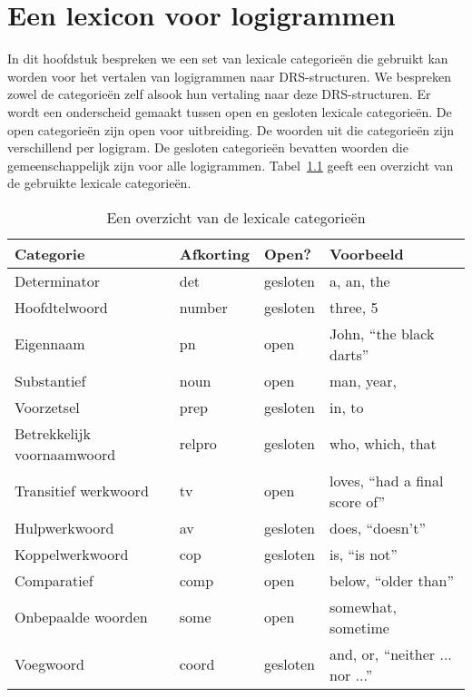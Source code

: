 \chapter{Een lexicon voor logigrammen}
\label{ch:lexicon}
In dit hoofdstuk bespreken we een set van lexicale categorieën die gebruikt kan worden voor het vertalen van logigrammen naar DRS-structuren. We bespreken zowel de categorieën zelf alsook hun vertaling naar deze DRS-structuren. Er wordt een onderscheid gemaakt tussen open en gesloten lexicale categorieën. De open categorieën zijn open voor uitbreiding. De woorden uit die categorieën zijn verschillend per logigram. De gesloten categorieën bevatten woorden die gemeenschappelijk zijn voor alle logigrammen. Tabel~\ref{tbl:lexiconCategories} geeft een overzicht van de gebruikte lexicale categorieën.

\begin{table}[t]
  \centering
  \begin{tabular}{llll}
    \toprule
    \textbf{Categorie} & \textbf{Afkorting} & \textbf{Open?} & \textbf{Voorbeeld}  \\ \midrule
    Determinator       & det                & gesloten & a, an, the \\
    Hoofdtelwoord      & number             & gesloten & three, 5      \\
    Eigennaam          & pn                 & open     & John, ``the black darts'' \\
    Substantief        & noun               & open     & man, year, \\
    Voorzetsel         & prep               & gesloten & in, to \\
    Betrekkelijk voornaamwoord & relpro     & gesloten & who, which, that \\
    Transitief werkwoord & tv               & open     & loves, ``had a final score of'' \\
    Hulpwerkwoord      & av                 & gesloten & does, ``doesn't'' \\
    Koppelwerkwoord    & cop                & gesloten & is, ``is not'' \\
    Comparatief        & comp               & open     & below, ``older than'' \\
    Onbepaalde woorden & some               & open     & somewhat, sometime \\
    Voegwoord          & coord              & gesloten & and, or, ``neither ... nor ...'' \\
    \bottomrule
  \end{tabular}
  \caption{Een overzicht van de lexicale categorieën}
  \label{tbl:lexiconCategories}
\end{table}

